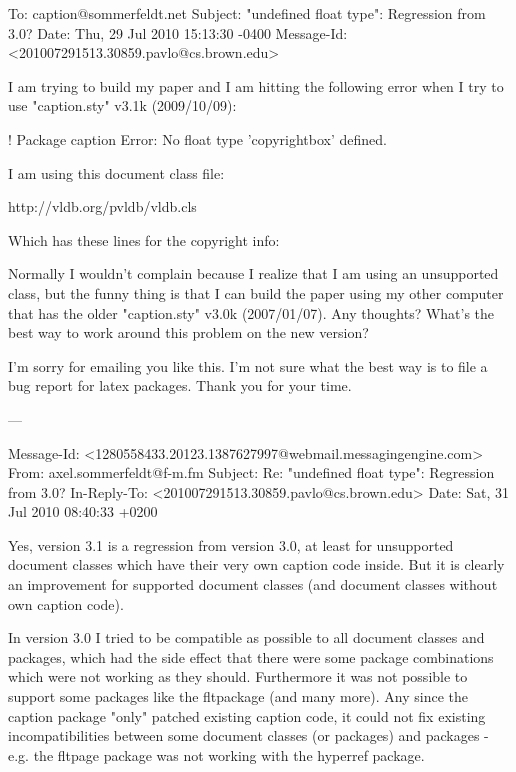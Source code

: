 \iffalse
To: caption@sommerfeldt.net
Subject: "undefined float type": Regression from 3.0?
Date: Thu, 29 Jul 2010 15:13:30 -0400
Message-Id: <201007291513.30859.pavlo@cs.brown.edu>

I am trying to build my paper and I am hitting the following error when I try 
to use "caption.sty" v3.1k (2009/10/09):

! Package caption Error: No float type 'copyrightbox' defined.

I am using this document class file:

http://vldb.org/pvldb/vldb.cls

Which has these lines for the copyright info:

\def\ftype@copyrightbox{8}
\def\@copyrightspace{
\@float{copyrightbox}[b]
\begin{center}
\setlength{\unitlength}{1pc}
\begin{picture}(20,5) %
\put(0,-.95){\crnotice{\@toappear}}
\end{picture}
\end{center}
\end@float}

Normally I wouldn't complain because I realize that I am using an unsupported 
class, but the funny thing is that I can build the paper using my other 
computer that has the older "caption.sty" v3.0k (2007/01/07). Any thoughts? 
What's the best way to work around this problem on the new version?

I'm sorry for emailing you like this. I'm not sure what the best way is to 
file a bug report for latex packages. Thank you for your time.

---

Message-Id: <1280558433.20123.1387627997@webmail.messagingengine.com>
From: axel.sommerfeldt@f-m.fm
Subject: Re: "undefined float type": Regression from 3.0?
In-Reply-To: <201007291513.30859.pavlo@cs.brown.edu>
Date: Sat, 31 Jul 2010 08:40:33 +0200

Yes, version 3.1 is a regression from version 3.0, at least for
unsupported document classes which have their very own caption code
inside. But it is clearly an improvement for supported document classes
(and document classes without own caption code).

In version 3.0 I tried to be compatible as possible to all document
classes and packages, which had the side effect that there were some
package combinations which were not working as they should. Furthermore
it was not possible to support some packages like the fltpackage (and
many more). Any since the caption package "only" patched existing
caption code, it could not fix existing incompatibilities between some
document classes (or packages) and packages - e.g. the fltpage package
was not working with the hyperref package.

